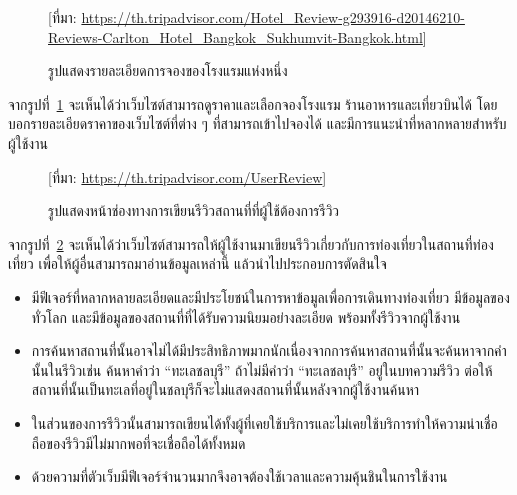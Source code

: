 \documentclass[12pt,oneside,openright,a4paper]{cpe-thai-project}
\begin{document}
\begin{figure}[!h]\centering
\setlength{\fboxrule}{0.1mm}
\caption{รูปแสดงรายละเอียดการจองของโรงแรมแห่งหนึ่ง}\label{fig:F2.3}
[ที่มา: \href{https://th.tripadvisor.com/Hotel\_Review-g293916-d20146210-Reviews-Carlton\_Hotel\_Bangkok\_Sukhumvit-Bangkok.html} {https://th.tripadvisor.com/Hotel\_Review-g293916-d20146210-Reviews-Carlton\_Hotel\_Bangkok\_Sukhumvit-Bangkok.html}]
\end{figure}
จากรูปที่~\ref{fig:F2.3} จะเห็นได้ว่าเว็บไซต์สามารถดูราคาและเลือกจองโรงแรม ร้านอาหารและเที่ยวบินได้ โดยบอกรายละเอียดราคาของเว็บไซต์ที่ต่าง ๆ ที่สามารถเข้าไปจองได้ และมีการแนะนำที่หลากหลายสำหรับผู้ใช้งาน \\

\begin{figure}[!h]\centering
\setlength{\fboxrule}{0.1mm}
\caption{รูปแสดงหน้าช่องทางการเขียนรีวิวสถานที่ที่ผู้ใช้ต้องการรีวิว}\label{fig:F2.4}\hspace{0.25cm}
[ที่มา: \href{https://th.tripadvisor.com/UserReview} {https://th.tripadvisor.com/UserReview}]
\end{figure}
จากรูปที่~\ref{fig:F2.4} จะเห็นได้ว่าเว็บไซต์สามารถให้ผู้ใช้งานมาเขียนรีวิวเกี่ยวกับการท่องเที่ยวในสถานที่ท่องเที่ยว เพื่อให้ผู้อื่นสามารถมาอ่านข้อมูลเหล่านี้ แล้วนำไปประกอบการตัดสินใจ \newpage


\begin{itemize}
\item มีฟีเจอร์ที่หลากหลายละเอียดและมีประโยชน์ในการหาข้อมูลเพื่อการเดินทางท่องเที่ยว มีข้อมูลของทั่วโลก และมีข้อมูลของสถานที่ที่ได้รับความนิยมอย่างละเอียด พร้อมทั้งรีวิวจากผู้ใช้งาน
\end{itemize}
\begin{itemize}
\item การค้นหาสถานที่นั้นอาจไม่ได้มีประสิทธิภาพมากนักเนื่องจากการค้นหาสถานที่นั้นจะค้นหาจากคำนั้นในรีวิวเช่น ค้นหาคำว่า “ทะเลชลบุรี” ถ้าไม่มีคำว่า “ทะเลชลบุรี” อยู่ในบทความรีวิว ต่อให้สถานที่นั้นเป็นทะเลที่อยู่ในชลบุรีก็จะไม่แสดงสถานที่นั้นหลังจากผู้ใช้งานค้นหา 
\item ในส่วนของการรีวิวนั้นสามารถเขียนได้ทั้งผู้ที่เคยใช้บริการและไม่เคยใช้บริการทำให้ความน่าเชื่อถือของรีวิวมีไม่มากพอที่จะเชื่อถือได้ทั้งหมด
\item ด้วยความที่ตัวเว็บมีฟีเจอร์จำนวนมากจึงอาจต้องใช้เวลาและความคุ้นชินในการใช้งาน
\end{itemize}
\end{document}
